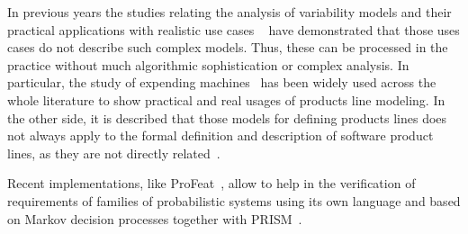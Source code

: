 In previous years the studies relating the analysis of variability models and
their practical applications with realistic use cases ~\cite{jhf11, jhfes12}
have demonstrated that those uses cases do not describe such complex models. Thus, these
can be processed in the practice without much algorithmic sophistication or
complex analysis.
In particular, the study of expending machines~\cite{jhfes12}
has been widely used across the whole
literature to show practical and real usages of products
line modeling. In the other 
side, it is described that those models for defining products
lines does not always apply to the
formal definition and description of software
product lines, as they are not directly related~\cite{cds06, fub06, nnz14}.

Recent implementations, like ProFeat~\cite{Chrszon2018}, allow to 
help in the verification of requirements of families of probabilistic systems using 
its own language and based on Markov decision processes together with PRISM~\cite{mgd12}.


